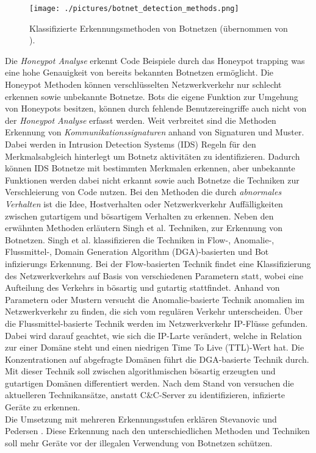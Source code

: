 \begin{figure}[h!]
    \centering
    \texttt{[image: ./pictures/botnet\_detection\_methods.png]}
    \caption{Klassifizierte Erkennungsmethoden von Botnetzen (übernommen von \cite{Xing2021SurveyOB}).}
    \label{fig:bot_det_met}
\end{figure}

Die \textit{Honeypot Analyse} erkennt Code Beispiele durch das Honeypot trapping was eine hohe Genauigkeit von bereits bekannten Botnetzen ermöglicht. Die Honeypot Methoden können
verschlüsselten Netzwerkverkehr nur schlecht erkennen sowie unbekannte Botnetze. Bots die eigene Funktion zur Umgehung von Honeypots besitzen, können durch fehlende Benutzereingriffe
auch nicht von der \textit{Honeypot Analyse} erfasst werden. Weit verbreitet sind die Methoden Erkennung von \textit{Kommunikationssignaturen} anhand von Signaturen und Muster. Dabei 
werden in Intrusion Detection Systems (IDS) Regeln für den Merkmalsabgleich hinterlegt um Botnetz aktivitäten zu identifizieren. Dadurch können IDS Botnetze mit bestimmten Merkmalen 
erkennen, aber unbekannte Funktionen werden dabei nicht erkannt sowie auch Botnetze die Techniken zur Verschleierung von Code nutzen. Bei den Methoden die durch 
\textit{abnormales Verhalten} ist die Idee, Hostverhalten oder Netzwerkverkehr Auffälligkeiten zwischen gutartigem und bösartigem Verhalten zu erkennen. Neben den erwähnten Methoden 
erläutern Singh et al. \cite{DBLP:journals/compsec/SinghSK19} Techniken, zur Erkennung von Botnetzen. Singh et al. klassifizieren die Techniken in Flow-, Anomalie-, Flussmittel-, Domain Generation 
Algorithm (DGA)-basierten \cite{DBLP:journals/jksucis/ManasrahKF22} und Bot infizierungs Erkennung. Bei der Flow-basierten Technik findet eine Klassifizierung des Netzwerkverkehrs auf 
Basis von verschiedenen Parametern statt, wobei eine Aufteilung des Verkehrs in bösartig und gutartig stattfindet. Anhand von Parametern oder Mustern versucht die Anomalie-basierte Technik 
anomalien im Netzwerkverkehr zu finden, die sich vom regulären Verkehr unterscheiden. Über die Flussmittel-basierte Technik werden im Netzwerkverkehr IP-Flüsse gefunden. Dabei wird darauf 
geachtet, wie sich die IP-Larte verändert, welche in Relation zur einer Domäne steht und einen niedrigen Time To Live (TTL)-Wert hat. Die Konzentrationen auf abgefragte Domänen führt die 
DGA-basierte Technik durch. Mit dieser Technik soll zwischen algorithmischen bösartig erzeugten und gutartigen Domänen differentiert werden. Nach dem Stand von \cite{DBLP:journals/compsec/SinghSK19} 
versuchen die aktuelleren Technikansätze, anstatt C\&C-Server zu identifizieren, infizierte Geräte zu erkennen. \\ Die Umsetzung mit mehreren Erkennungsstufen erklären Stevanovic und Pedersen 
\cite{DBLP:journals/ijcysa/StevanovicP16}. Diese Erkennung nach den unterschiedlichen Methoden und Techniken soll mehr Geräte vor der illegalen Verwendung von Botnetzen schützen. 

